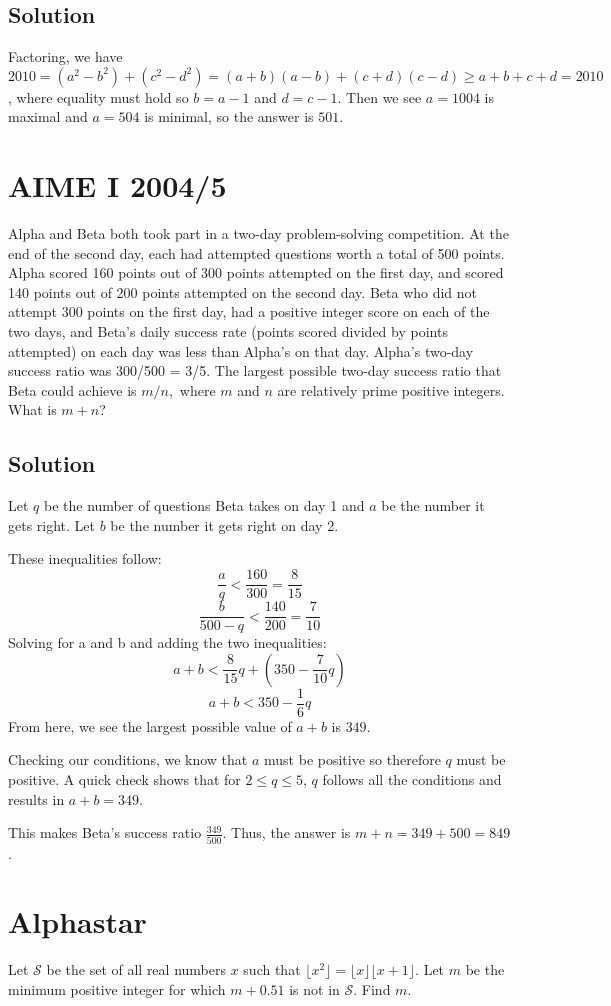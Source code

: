 \documentclass[mast]{lucky}
\begin{document}
\subsection{Solution}
Factoring, we have
$2010 = (a^2 - b^2) + (c^2 - d^2) = (a + b)(a - b) + (c + d)(c - d) \ge a + b + c + d = 2010$, where equality must hold so $b = a - 1$ and $d = c - 1$. Then we see $a = 1004$ is maximal and $a = 504$ is minimal, so the answer is $\boxed{501}$.
\pagebreak\section{AIME I 2004/5}
Alpha and Beta both took part in a two-day problem-solving competition. At the end of the second day, each had attempted questions worth a total of 500 points. Alpha scored 160 points out of 300 points attempted on the first day, and scored 140 points out of 200 points attempted on the second day. Beta who did not attempt 300 points on the first day, had a positive integer score on each of the two days, and Beta's daily success rate (points scored divided by points attempted) on each day was less than Alpha's on that day. Alpha's two-day success ratio was 300/500 = 3/5. The largest possible two-day success ratio that Beta could achieve is $m/n,$ where $m$ and $n$ are relatively prime positive integers. What is $m+n$?
\subsection{Solution}
Let $q$ be the number of questions Beta takes on day 1 and $a$ be the number it gets right. Let $b$ be the number it gets right on day 2.

These inequalities follow:\[\frac{a}{q} < \frac{160}{300} = \frac{8}{15}\]\[\frac{b}{500-q} < \frac{140}{200} = \frac{7}{10}\]Solving for a and b and adding the two inequalities:\[a + b < \frac{8}{15}q + (350 - \frac{7}{10}q)\]\[a + b < 350 - \frac{1}{6}q\]From here, we see the largest possible value of $a+b$ is $349$.

Checking our conditions, we know that $a$ must be positive so therefore $q$ must be positive. A quick check shows that for $2\le q \le 5$, $q$ follows all the conditions and results in $a+b=349$.

This makes Beta's success ratio $\frac{349}{500}$. Thus, the answer is $m+n = 349 + 500 = \boxed{849}$.

\pagebreak\section{Alphastar}
Let $\mathcal{S}$ be the set of all real numbers $x$ such that $\lfloor x^2\rfloor=\lfloor x\rfloor\lfloor x+1\rfloor$. Let $m$ be the minimum positive integer for which $m+0.51$ is not in $\mathcal{S}$. Find $m$.
\end{document}
